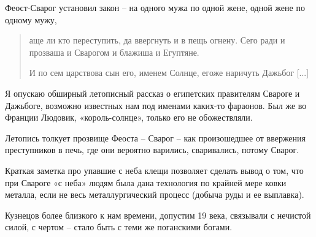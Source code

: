 Феост-Сварог установил закон – на одного мужа по одной жене, одной жене по одному мужу,

\begin{quotation}
аще ли кто переступить, да ввергнуть и в пещь огнену. Сего ради и прозваша и Сварогом и блажиша и Егуптяне.

И по сем царствова сын его, именем Солнце, егоже наричуть Дажьбог [...]
\end{quotation} 

Я опускаю обширный летописный рассказ о египетских правителям Свароге и Дажьбоге, возможно известных нам под именами каких-то фараонов. Был же во Франции Людовик, «король-солнце», только его не обожествляли.

Летопись толкует прозвище Феоста – Сварог – как произошедшее от ввержения преступников в печь, где они вероятно варились, сваривались, потому Сварог.

Краткая заметка про упавшие с неба клещи позволяет сделать вывод о том, что при Свароге «с неба» людям была дана технология по крайней мере ковки металла, если не весь металлургический процесс (добыча руды и ее выплавка).

Кузнецов более близкого к нам времени, допустим 19 века, связывали с нечистой силой, с чертом – стало быть с теми же поганскими богами.

